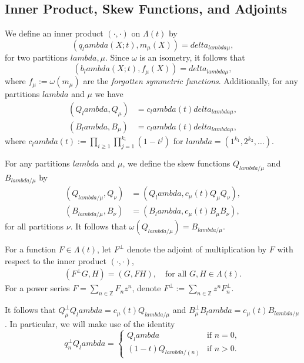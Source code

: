 \documentclass[12pt]{amsart}%
\def\lambda{lambda}%
\def\delta{delta}%
\theoremstyle{remark}
\theoremstyle{definition}
\newcommand{\Z}{\mathbb{Z}}
\begin{document}
    \subsection{Inner Product, Skew Functions, and Adjoints}

    We define an inner product $(\cdot,\cdot)$ on $\Lambda(t)$ by
    \[(q_\lambda(X;t),m_\mu(X))=\delta_{\lambda\mu},\]
    for two partitions $\lambda,\mu$. Since $\omega$ is an isometry, it follows that
    \[(b_\lambda(X;t),f_\mu(X))=\delta_{\lambda\mu},\]
    where $f_\mu:=\omega(m_\mu)$ are the \emph{forgotten symmetric functions}. Additionally, for any partitions $\lambda$ and $\mu$ we have
    \begin{align*}
        (Q_\lambda,Q_\mu)&=c_\lambda(t)\delta_{\lambda\mu},\\
        (B_\lambda,B_\mu)&=c_\lambda(t)\delta_{\lambda\mu},
    \end{align*}
    where $c_\lambda(t):=\prod_{i\geq1}\prod_{j=1}^{k_i}(1-t^j)$ for $\lambda=(1^{k_1},2^{k_2},\ldots)$.

    For any partitions $\lambda$ and $\mu$, we define the skew functions $Q_{\lambda/\mu}$ and $B_{\lambda/\mu}$ by
    \begin{align*}
        (Q_{\lambda/\mu},Q_\nu)&=(Q_\lambda,c_\mu(t)Q_\mu Q_\nu),\\
        (B_{\lambda/\mu},B_\nu)&=(B_\lambda,c_\mu(t)B_\mu B_\nu),
    \end{align*}
    for all partitions $\nu$. It follows that $\omega(Q_{\lambda/\mu})=B_{\lambda/\mu}$.



    For a function $F\in\Lambda(t)$, let $F^\perp$ denote the adjoint of multiplication by $F$ with respect to the inner product $(\cdot,\cdot)$, 
    \begin{align*}
        (F^\perp G,H)=(G,FH),\quad\text{for all } G,H\in\Lambda(t).
    \end{align*}
    For a power series $F=\sum_{n\in\Z}F_nz^n$, denote $F^\perp:=\sum_{n\in\Z}z^nF_n^\perp$.

    It follows that $Q_\mu^\perp Q_\lambda=c_\mu(t)Q_{\lambda/\mu}$ and $B_\mu^\perp B_\lambda=c_\mu(t)B_{\lambda/\mu}$. In particular, we will make use of the identity
    \begin{equation}\label{eqn: q_n^perp Q_lambda}
        q_n^\perp Q_\lambda=
            \begin{cases}
                Q_\lambda&\text{if }n=0,\\
                (1-t)Q_{\lambda/(n)}&\text{if }n>0.
            \end{cases}
    \end{equation}
\end{document}
